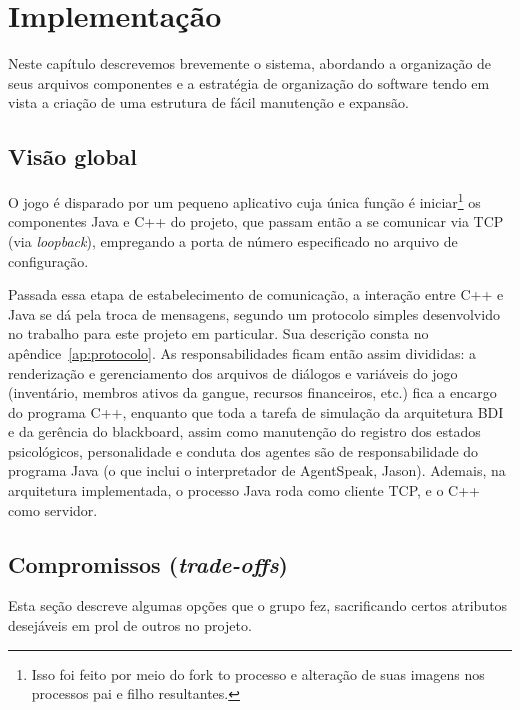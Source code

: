 \chapter{Implementação}

Neste capítulo descrevemos brevemente o sistema, abordando a organização de seus arquivos componentes e a estratégia de organização do software tendo em vista a criação de uma estrutura de fácil manutenção e expansão.

\section{Visão global}

O jogo é disparado por um pequeno aplicativo cuja única função é iniciar\footnote{Isso foi feito por meio do fork to processo e alteração de suas imagens nos processos pai e filho resultantes.} os componentes Java e C++ do projeto, que passam então a se comunicar via TCP (via \emph{loopback}), empregando a porta de número especificado no arquivo de configuração.

Passada essa etapa de estabelecimento de comunicação, a interação entre C++ e Java se dá pela troca de mensagens, segundo um protocolo simples desenvolvido no trabalho para este projeto em particular. Sua descrição consta no apêndice~\ref{ap:protocolo}. As responsabilidades ficam então assim divididas: a renderização e gerenciamento dos arquivos de diálogos e variáveis do jogo (inventário, membros ativos da gangue, recursos financeiros, etc.) fica a encargo do programa C++, enquanto que toda a tarefa de simulação da arquitetura  BDI e da gerência do blackboard, assim como manutenção do registro dos estados psicológicos, personalidade e conduta dos agentes são de responsabilidade do programa Java (o que inclui o interpretador de AgentSpeak, Jason). Ademais, na arquitetura implementada, o processo Java roda como cliente TCP, e o C++ como servidor.



\section{Compromissos (\emph{trade-offs})}\label{sec:tradeoffs}

Esta seção descreve algumas opções que o grupo fez, sacrificando certos atributos desejáveis em prol de outros no projeto. 

